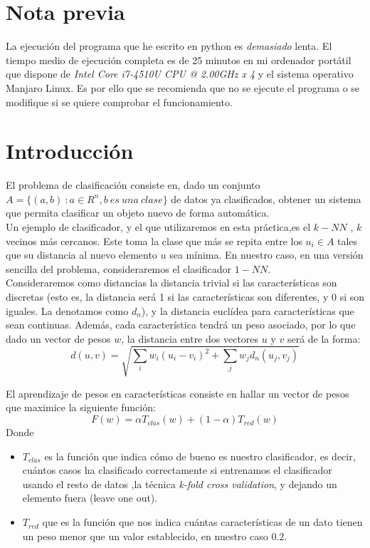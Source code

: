 \documentclass[11pt]{article}
\begin{document}
\section*{Nota previa}
La ejecución del programa que he escrito en python es \emph{demasiado} lenta. El tiempo medio de ejecución completa es de 25 minutos en mi ordenador portátil que dispone de \emph{Intel Core i7-4510U CPU @ 2.00GHz x 4 } y el sistema operativo Manjaro Linux. Es por ello que se recomienda que no se ejecute el programa o se modifique si se quiere comprobar el funcionamiento.

\section{Introducción}
El problema de clasificación consiste en, dado un conjunto $A=\{(a,b) \ : a \in R^n, b \ es \ una \ clase\}$ de datos ya clasificados, obtener un sistema que permita clasificar un objeto nuevo de forma automática.\\

 Un ejemplo de clasificador, y el que utilizaremos en esta práctica,es el $k-NN$ , $k$ vecinos más cercanos. Este toma la clase que más se repita entre los $u_i\in A$ tales que su distancia al nuevo elemento $u$ sea mínima. En nuestro caso, en una versión sencilla del problema, consideraremos el clasificador $1-NN$. \\

Consideraremos como distancias la distancia trivial si las características son discretas (esto es, la distancia será 1 si las características son diferentes, y 0 si son iguales. La denotamos como $d_n$), y la distancia euclídea para características que sean continuas. Además, cada característica tendrá un peso asociado, por lo que dado un vector de pesos $w$, la distancia entre dos vectores $u$ y $v$ será de la forma:
\[
d(u,v) = \sqrt {\sum_i w_i(u_i- v_i)^2 + \sum_j w_j d_n(u_j,v_j)}
\]

 El aprendizaje de pesos en características consiste  en hallar un vector de pesos que maximice la siguiente función:
\[
F(w) = \alpha T_{clas}(w) + (1-\alpha)T_{red}(w)
\]
Donde
\begin{itemize}
\item $T_{clas}$ es la función que indica cómo de bueno es nuestro clasificador, es decir, cuántos casos ha clasificado correctamente si entrenamos el clasificador usando el resto de datos ,la técnica \emph{k-fold cross validation}, y dejando un elemento fuera (leave one out).
	\item $T_{red}$ que es la función que nos indica cuántas características de un dato tienen un peso menor que un valor establecido, en nuestro caso $0.2$.
\end{itemize}
\end{document}
